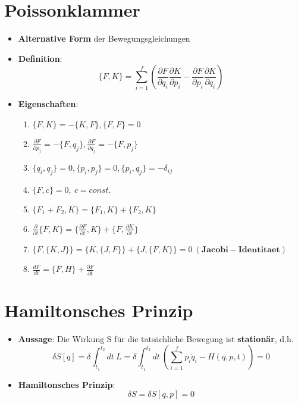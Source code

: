 \section{Poissonklammer}
\label{hform:sec:poissonklammer}

\begin{itemize}
	\item \textbf{Alternative Form} der Bewegungsgleichungen
	\item \textbf{Definition}:
	$$
		\{F, K\} = \sum^f_{i=1}(\frac{\partial F}{\partial q_i}\frac{\partial K}{\partial p_i} - \frac{\partial F}{\partial p_i}\frac{\partial K}{\partial q_i})
	$$
	\newpage
	\item \textbf{Eigenschaften}:
	\begin{enumerate}
		\item $\{F, K\} = -\{K, F\}, \{F, F\} = 0$
		\item $\frac{\partial F}{\partial p_j} = -\{F, q_j\}, \frac{\partial F}{\partial q_j} = -\{F, p_j\}$
		\item $\{q_i, q_j\} = 0, \{p_i, p_j\} = 0, \{p_i, q_j\} = -\delta_{ij}$
		\item $\{F, c\} = 0,\ c = const.$
		\item $\{F_1 + F_2, K\} = \{F_1, K\} + \{F_2, K\}$
		\item $\frac{\partial}{\partial t}\{F, K\} = \{\frac{\partial F}{\partial t}, K\} + \{F, \frac{\partial K}{\partial t}\}$
		\item $\{F, \{K, J\}\} = \{K, \{J, F\}\} + \{J, \{F, K\}\} = 0\ (\mathbf{Jacobi-Identitaet})$
		\item $\frac{dF}{dt} = \{F, H\} + \frac{\partial F}{\partial t}$
	\end{enumerate}
\end{itemize}

\section{Hamiltonsches Prinzip}
\label{hform:sec:hamiltonsches_prinzip}

\begin{itemize}
	\item \textbf{Aussage}: Die Wirkung S für die tatsächliche Bewegung ist \textbf{stationär}, d.h.
	$$
		\delta S[q] = \delta \int^{t_2}_{t_1}dt\ L = \delta \int^{t_2}_{t_1}dt\ (\sum^f_{i=1}p_i\dot{q}_i - H(q, p, t)) = 0
	$$
	\item \textbf{Hamiltonsches Prinzip}:
	$$
		\delta S = \delta S[q, p] = 0
	$$
\end{itemize}

